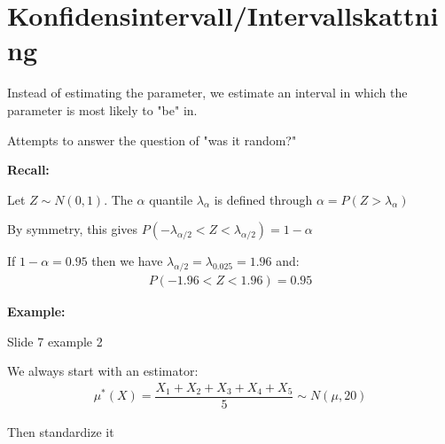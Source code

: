\section{Konfidensintervall/Intervallskattning}\par
\noindent Instead of estimating the parameter, we estimate an interval in which the parameter is most likely to "be" in.
\par\bigskip
\noindent Attempts to answer the question of "was it random?"
\par\bigskip
\noindent\textbf{Recall:}\par
\noindent Let $Z\sim N(0,1)$. The $\alpha$ quantile $\lambda_\alpha$ is defined through $\alpha = P(Z>\lambda_\alpha)$
\par\bigskip
\noindent By symmetry, this gives $P(-\lambda_{\alpha/2}<Z<\lambda_{\alpha/2}) = 1-\alpha$
\par\bigskip
\noindent If $1-\alpha = 0.95$ then we have $\lambda_{\alpha/2} = \lambda_{0.025} = 1.96$ and:
\begin{equation*}
  \begin{gathered}
    P(-1.96<Z<1.96) = 0.95
  \end{gathered}
\end{equation*}
\par\bigskip
\noindent\textbf{Example:}\par
Slide 7 example 2\par
\noindent  We always start with an estimator:
\begin{equation*}
  \begin{gathered}
    \mu^*(X) = \dfrac{X_1+X_2+X_3+X_4+X_5}{5}\sim N(\mu,20)
  \end{gathered}
\end{equation*}
\par\bigskip
\noindent Then standardize it

